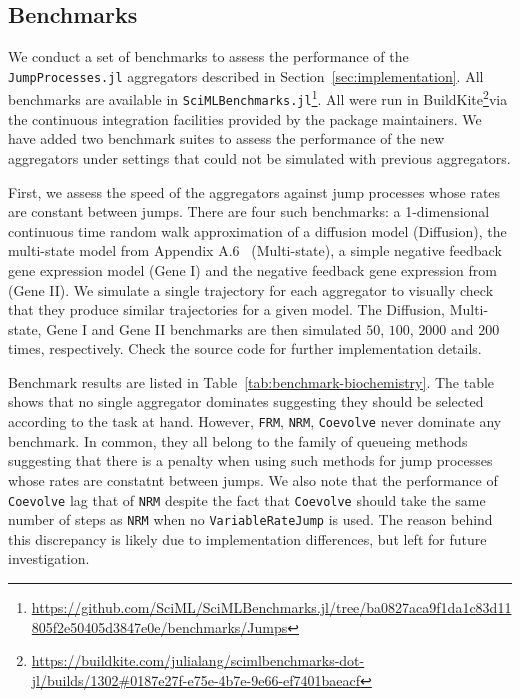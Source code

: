\documentclass{juliacon}
\numberwithin{equation}{section}
\begin{document}
\subsection{Benchmarks} \label{subsec:benchmark}

We conduct a set of benchmarks to assess the performance of the \texttt{JumpProcesses.jl} aggregators described in Section~\ref{sec:implementation}. All benchmarks are available in \texttt{SciMLBenchmarks.jl}\footnote{\url{https://github.com/SciML/SciMLBenchmarks.jl/tree/ba0827aca9f1da1c83d11805f2e50405d3847e0e/benchmarks/Jumps}}. All were run in BuildKite\footnote{\url{https://buildkite.com/julialang/scimlbenchmarks-dot-jl/builds/1302\#0187e27f-e75e-4b7e-9e66-ef7401baeacf}}via the continuous integration facilities provided by the package maintainers. We have added two benchmark suites to assess the performance of the new aggregators under settings that could not be simulated with previous aggregators.

First, we assess the speed of the aggregators against jump processes whose rates are constant between jumps. There are four such benchmarks: a 1-dimensional continuous time random walk approximation of a diffusion model (Diffusion), the multi-state model from Appendix A.6~\cite{marchetti2017} (Multi-state), a simple negative feedback gene expression model (Gene I) and the negative feedback gene expression from~\cite{gupta2018} (Gene II). We simulate a single trajectory for each aggregator to visually check that they produce similar trajectories for a given model. The Diffusion, Multi-state, Gene I and Gene II benchmarks are then simulated \( 50 \), \( 100 \), \( 2000 \) and \( 200 \) times, respectively. Check the source code for further implementation details.

Benchmark results are listed in Table~\ref{tab:benchmark-biochemistry}. The table shows that no single aggregator dominates suggesting they should be selected according to the task at hand. However, \texttt{FRM}, \texttt{NRM}, \texttt{Coevolve} never dominate any benchmark. In common, they all belong to the family of queueing methods suggesting that there is a penalty when using such methods for jump processes whose rates are constatnt between jumps. We also note that the performance of \texttt{Coevolve} lag that of \texttt{NRM} despite the fact that \texttt{Coevolve} should take the same number of steps as \texttt{NRM} when no \texttt{VariableRateJump} is used. The reason behind this discrepancy is likely due to implementation differences, but left for future investigation.
\end{document}
